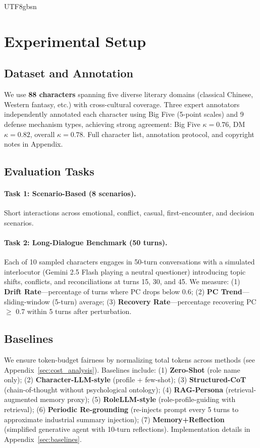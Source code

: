 \documentclass[11pt]{article}
\begin{document}
\begin{CJK*}{UTF8}{gbsn}
\section{Experimental Setup}

\subsection{Dataset and Annotation}

We use \textbf{88 characters} spanning five diverse literary domains (classical Chinese, Western fantasy, etc.) with cross-cultural coverage. Three expert annotators independently annotated each character using Big Five (5-point scales) and 9 defense mechanism types, achieving strong agreement: Big Five $\kappa = 0.76$, DM $\kappa = 0.82$, overall $\kappa = 0.78$. Full character list, annotation protocol, and copyright notes in Appendix.


\subsection{Evaluation Tasks}

\paragraph{Task 1: Scenario-Based (8 scenarios).} Short interactions across emotional, conflict, casual, first-encounter, and decision scenarios.

\paragraph{Task 2: Long-Dialogue Benchmark (50 turns).} Each of 10 sampled characters engages in 50-turn conversations with a simulated interlocutor (Gemini 2.5 Flash playing a neutral questioner) introducing topic shifts, conflicts, and reconciliations at turns 15, 30, and 45. We measure: (1) \textbf{Drift Rate}---percentage of turns where PC drops below 0.6; (2) \textbf{PC Trend}---sliding-window (5-turn) average; (3) \textbf{Recovery Rate}---percentage recovering PC $\geq$ 0.7 within 5 turns after perturbation.


\subsection{Baselines}

We ensure token-budget fairness by normalizing total tokens across methods (see Appendix~\ref{sec:cost_analysis}). Baselines include: (1) \textbf{Zero-Shot} (role name only); (2) \textbf{Character-LLM-style} \citep{shao2023character} (profile + few-shot); (3) \textbf{Structured-CoT} (chain-of-thought without psychological ontology); (4) \textbf{RAG-Persona} (retrieval-augmented memory proxy); (5) \textbf{RoleLLM-style} \citep{wang2024rolellm} (role-profile-guiding with retrieval); (6) \textbf{Periodic Re-grounding} (re-injects prompt every 5 turns to approximate industrial summary injection); (7) \textbf{Memory+Reflection} (simplified generative agent with 10-turn reflections). Implementation details in Appendix~\ref{sec:baselines}.

\end{CJK*}
\end{document}
